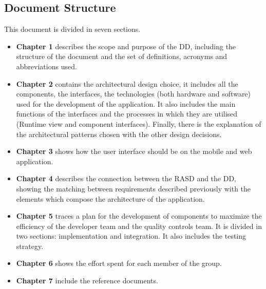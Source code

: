 \subsection{Document Structure}
This document is divided in seven sections.
\begin{itemize}
    \item \textbf{Chapter 1} describes the scope and purpose of the DD, including the structure of the document and the set of definitions, acronyms and abbreviations used.
    
    \item \textbf{Chapter 2} contains the architectural design choice, it includes all the components, the interfaces, the technologies (both hardware and software) used for the development of the application. It also includes the main functions of the interfaces and the processes in which they are utilised (Runtime view and component interfaces). Finally, there is the explanation of the architectural patterns chosen with the other design decisions.
    
    \item \textbf{Chapter 3} shows how the user interface should be on the mobile and web application.
    
    \item \textbf{Chapter 4} describes the connection between the RASD and the DD, showing the matching between requirements described previously with the elements which compose the architecture of the application.
    
    \item \textbf{Chapter 5} traces a plan for the development of components to maximize the efficiency of the developer team and the quality controls team. It is divided in two sections: implementation and integration. It also includes the testing strategy.
    
    \item \textbf{Chapter 6} shows the effort spent for each member of the group.
    
    \item \textbf{Chapter 7} include the reference documents.
 \end{itemize}

\vfill

\clearpage